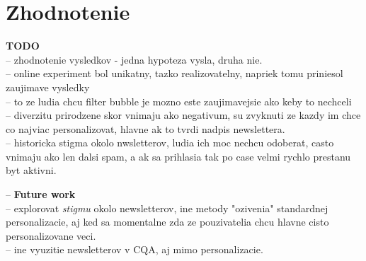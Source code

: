 \newpage

\chapter{Zhodnotenie}

\textbf{TODO}\\
-- zhodnotenie vysledkov - jedna hypoteza vysla, druha nie.\\
-- online experiment bol unikatny, tazko realizovatelny, napriek tomu priniesol zaujimave vysledky\\
-- to ze ludia chcu filter bubble je mozno este zaujimavejsie ako keby to nechceli\\
-- diverzitu prirodzene skor vnimaju ako negativum, su zvyknuti ze kazdy im chce co najviac personalizovat, hlavne ak
to tvrdi nadpis newslettera.\\
-- historicka stigma okolo nwsletterov, ludia ich moc nechcu odoberat, casto vnimaju ako len dalsi spam, a ak sa prihlasia
tak po case velmi rychlo prestanu byt aktivni.

-- \textbf{Future work}\\
-- explorovat \textit{stigmu} okolo newsletterov, ine metody "ozivenia" standardnej personalizacie,
aj ked sa momentalne zda ze pouzivatelia chcu hlavne cisto personalizovane veci.\\
-- ine vyuzitie newsletterov v CQA, aj mimo personalizacie.






